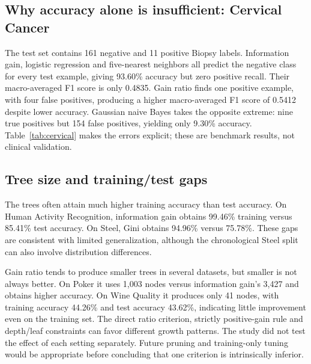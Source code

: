 \documentclass[11pt,letterpaper]{article}
\begin{document}
\subsection{Why accuracy alone is insufficient: Cervical Cancer}
The test set contains 161 negative and 11 positive Biopsy labels. Information gain, logistic regression and
five-nearest neighbors all predict the negative class for every test example, giving 93.60\%
accuracy but zero positive recall. Their macro-averaged F1 score is only 0.4835. Gain ratio finds one
positive example, with four false positives, producing a higher macro-averaged F1 score of
0.5412 despite lower accuracy. Gaussian naive Bayes takes the opposite extreme: nine true positives
but 154 false positives, yielding only 9.30\% accuracy. Table~\ref{tab:cervical}
makes the errors explicit; these are benchmark results, not clinical validation.

\begin{table}[htbp]\centering\small

\caption{Benchmark 2 confusion counts (number of cases), positive recall and F1 score (0--1; higher is better). Positive means Biopsy class 1.
The columns distinguish correctly predicted negative and positive cases from false alarms and missed positive cases.}
\label{tab:cervical}
\end{table}

\subsection{Tree size and training/test gaps}
\begin{table}[htbp]\centering\scriptsize

\caption{Tree size: number of nodes; depth: maximum splits from root to leaf; training and testing: accuracy (percent correct). Metrics
are from repetition one; the deterministic tree configurations use fixed data.}
\label{tab:trees}
\end{table}
The trees often attain much higher training accuracy than test accuracy. On Human Activity Recognition,
information gain obtains 99.46\% training versus 85.41\% test accuracy. On Steel, Gini obtains
94.96\% versus 75.78\%. These gaps are consistent with limited generalization,
although the chronological Steel split can also involve distribution differences.

Gain ratio tends to produce smaller trees in several datasets, but smaller is not always
better. On Poker it uses 1,003 nodes versus information gain's 3,427 and obtains higher accuracy.
On Wine Quality it produces only 41 nodes, with training accuracy 44.26\% and
test accuracy 43.62\%, indicating little improvement even on the training set.
The direct ratio criterion, strictly positive-gain rule and depth/leaf constraints
can favor different growth patterns. The study did not test the effect of each setting separately. Future pruning and training-only tuning would be appropriate before
concluding that one criterion is intrinsically inferior.
\end{document}
